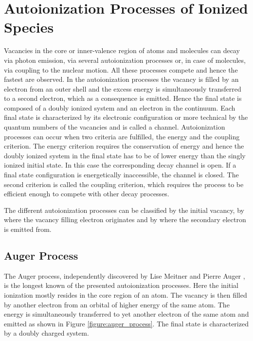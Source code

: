 \chapter{Autoionization Processes of Ionized Species}
\label{chapter:autoionization}
Vacancies in the core or inner-valence region of atoms and molecules
can decay via photon emission, via several autoionization processes or,
in case of molecules, via coupling to
the nuclear motion. All these
processes compete and hence the fastest are observed. In the autoionization
processes
the vacancy is filled by an electron from an outer shell and the excess
energy is simultaneously transferred to a second electron, which as a
consequence
is emitted. Hence the final state is composed of a doubly ionized system
and an electron in the continuum. Each final state is characterized by its
electronic configuration or more technical by the quantum numbers of the
vacancies and is called a channel. Autoionization processes can
occur when two criteria are fulfilled, the energy and the coupling criterion.
The energy criterion requires the conservation of energy and hence
the doubly ionized system in the
final state has to be of lower energy than the singly ionized initial state.
In this case the corresponding decay channel is open. If a final
state configuration
is energetically inaccessible, the channel is closed.
The second criterion is called the coupling criterion, which requires the
process to be efficient enough to compete with other decay processes.

The different autoionization processes can be classified by the initial
vacancy, by where the
vacancy filling electron originates and by where the secondary electron is
emitted from.

\section{Auger Process}
The Auger process, independently discovered by Lise Meitner \cite{Meitner22}
and Pierre Auger \cite{Auger23}, is the longest known of the presented
autoionization processes. Here
the initial ionization mostly resides in the core region of an atom. The vacancy
is then filled by another electron from an orbital of higher energy of
the same atom. The
energy is simultaneously transferred to yet another electron of the same atom and
emitted as shown in Figure \ref{figure:auger_process}. The final state is
characterized by a doubly charged system.

